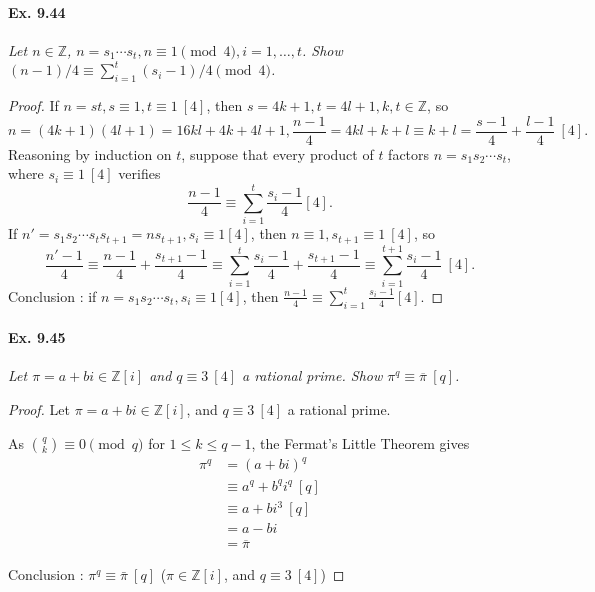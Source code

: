 \documentclass[11pt,a4paper]{article}
\newcommand{\Z}{\mathbb{Z}}
\begin{document}
\paragraph{Ex. 9.44}

{\it Let $n \in \Z$, $n = s_1\cdots s_t, n\equiv 1 \pmod 4, i = 1,\ldots,t$. Show $(n-1)/4\equiv \sum_{i=1}^t (s_i-1)/4 \pmod 4$.
}

\begin{proof}
If  $n = s t , s \equiv1,t\equiv1\ [4]$, then $s = 4k+1, t = 4 l +1, k,t \in \mathbb{Z}$, so
$$n = (4k+1)(4l+1) = 16 kl + 4k+4l+1, \frac{n-1}{4} = 4 kl + k + l \equiv k+l = \frac{s-1}{4}+\frac{l-1}{4} \ [4].$$
Reasoning by induction on $t$, suppose that  every product of $t$ factors $ n = s_1s_2\cdots s_t$, where $s_i\equiv 1 \ [4]$ verifies 
$$\frac{n-1}{4} \equiv \sum\limits_{i=1}^t \frac{s_i-1}{4} [4].$$
If $n' = s_1 s_2 \cdots s_t s_{t+1} = n s_{t+1}, s_i \equiv 1[4]$, then $n\equiv1,s_{t+1} \equiv 1 \ [4]$, so
$$\frac{n'-1}{4} \equiv \frac{n-1}{4} + \frac{s_{t+1}-1}{4} \equiv \sum\limits_{i=1}^t \frac{s_i-1}{4} + \frac{s_{t+1}-1}{4} \equiv \sum\limits_{i=1}^{t+1} \frac{s_i-1}{4} \ [4].$$
Conclusion :  if  $n = s_1 s_2 \cdots s_t, s_i \equiv 1 [4]$, then $\frac{n-1}{4} \equiv \sum\limits_{i=1}^t \frac{s_i-1}{4} [4]$.
\end{proof}

\paragraph{Ex. 9.45}

{\it Let $\pi = a + bi \in \Z[i]$ and $q\equiv 3 \ [4]$ a rational prime. Show $\pi^q \equiv \overline{\pi} \ [q]$.
}

\begin{proof}
Let $\pi=a+bi \in \mathbb{Z}[i]$, and $q\equiv 3 \ [4]$ a rational prime.

As $\binom{q}{k} \equiv 0 \pmod q$ for $1\leq k \leq q-1$, the Fermat's Little Theorem gives
\begin{align*}
\pi^q &=(a+bi)^q\\
&\equiv a^q+b^qi^q\ [q]\\
&\equiv a + b i^3 \ [q]\\
&= a-bi \\
&= \overline{\pi}
\end{align*}

Conclusion : $\pi^q \equiv \bar{\pi}\ [q]$ ($\pi \in \mathbb{Z}[i]$, and $q\equiv 3 \ [4]$)
\end{proof}
\end{document}

